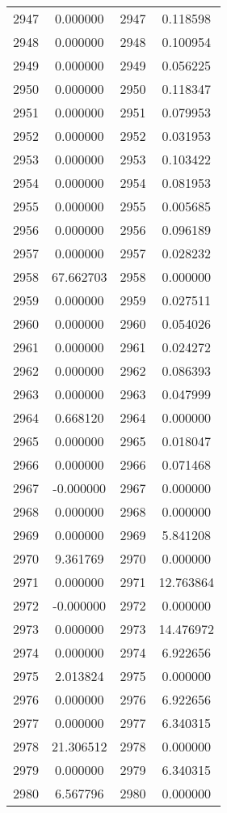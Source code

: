 \documentclass[12pt]{article}
\begin{document}
\begin{longtable}{@{}cccc@{}}
2947 & 0.000000 & 2947 & 0.118598 \\
2948 & 0.000000 & 2948 & 0.100954 \\
2949 & 0.000000 & 2949 & 0.056225 \\
2950 & 0.000000 & 2950 & 0.118347 \\
2951 & 0.000000 & 2951 & 0.079953 \\
2952 & 0.000000 & 2952 & 0.031953 \\
2953 & 0.000000 & 2953 & 0.103422 \\
2954 & 0.000000 & 2954 & 0.081953 \\
2955 & 0.000000 & 2955 & 0.005685 \\
2956 & 0.000000 & 2956 & 0.096189 \\
2957 & 0.000000 & 2957 & 0.028232 \\
2958 & 67.662703 & 2958 & 0.000000 \\
2959 & 0.000000 & 2959 & 0.027511 \\
2960 & 0.000000 & 2960 & 0.054026 \\
2961 & 0.000000 & 2961 & 0.024272 \\
2962 & 0.000000 & 2962 & 0.086393 \\
2963 & 0.000000 & 2963 & 0.047999 \\
2964 & 0.668120 & 2964 & 0.000000 \\
2965 & 0.000000 & 2965 & 0.018047 \\
2966 & 0.000000 & 2966 & 0.071468 \\
2967 & -0.000000 & 2967 & 0.000000 \\
2968 & 0.000000 & 2968 & 0.000000 \\
2969 & 0.000000 & 2969 & 5.841208 \\
2970 & 9.361769 & 2970 & 0.000000 \\
2971 & 0.000000 & 2971 & 12.763864 \\
2972 & -0.000000 & 2972 & 0.000000 \\
2973 & 0.000000 & 2973 & 14.476972 \\
2974 & 0.000000 & 2974 & 6.922656 \\
2975 & 2.013824 & 2975 & 0.000000 \\
2976 & 0.000000 & 2976 & 6.922656 \\
2977 & 0.000000 & 2977 & 6.340315 \\
2978 & 21.306512 & 2978 & 0.000000 \\
2979 & 0.000000 & 2979 & 6.340315 \\
2980 & 6.567796 & 2980 & 0.000000 \\

\end{longtable}
\end{document}
